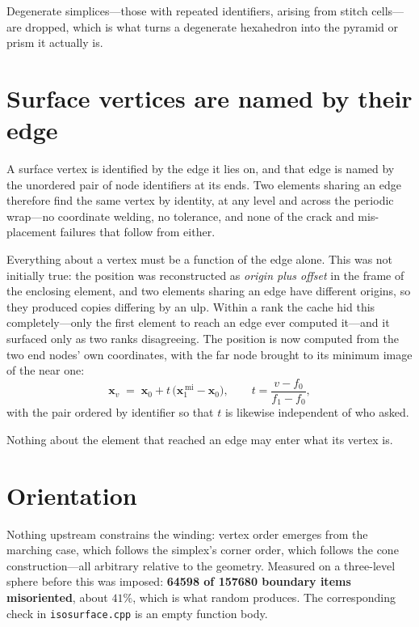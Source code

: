 Degenerate simplices---those with repeated identifiers, arising from stitch
cells---are dropped, which is what turns a degenerate hexahedron into the
pyramid or prism it actually is.

\section{Surface vertices are named by their edge}
\label{sec:edgekey}

A surface vertex is identified by the edge it lies on, and that edge is named by
the unordered pair of node identifiers at its ends. Two elements sharing an
edge therefore find the same vertex by identity, at any level and across the
periodic wrap---no coordinate welding, no tolerance, and none of the crack and
mis-placement failures that follow from either.

Everything about a vertex must be a function of the edge alone. This was not
initially true: the position was reconstructed as \emph{origin plus offset} in
the frame of the enclosing element, and two elements sharing an edge have
different origins, so they produced copies differing by an ulp. Within a rank
the cache hid this completely---only the first element to reach an edge ever
computed it---and it surfaced only as two ranks disagreeing. The position is now
computed from the two end nodes' own coordinates, with the far node brought to
its minimum image of the near one:
\begin{equation}
  \mathbf{x}_v \;=\; \mathbf{x}_0 + t\,\bigl(\mathbf{x}_1^{\,\mathrm{mi}} - \mathbf{x}_0\bigr),
  \qquad
  t = \frac{v - f_0}{f_1 - f_0},
  \label{eq:vertpos}
\end{equation}
with the pair ordered by identifier so that $t$ is likewise independent of who
asked.

\begin{designrule}\label{rule:edgefn}
Nothing about the element that reached an edge may enter what its vertex is.
\end{designrule}

\section{Orientation}
\label{sec:orient}

Nothing upstream constrains the winding: vertex order emerges from the marching
case, which follows the simplex's corner order, which follows the cone
construction---all arbitrary relative to the geometry. Measured on a three-level
sphere before this was imposed: \textbf{64598 of 157680 boundary items
misoriented}, about $41\%$, which is what random produces. The corresponding
check in \texttt{isosurface.cpp} is an empty function body.

